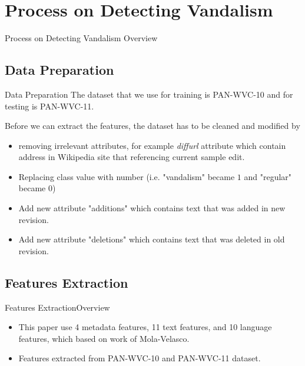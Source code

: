 \documentclass[english]{beamer}
\begin{document}

\section{Process on Detecting Vandalism}

\begin{frame}
	\begin{multicols}{2}
		\tableofcontents[currentsection]
	\end{multicols}
\end{frame}

\begin{frame}
	{Process on Detecting Vandalism}
	{Overview}
	
\end{frame}

\subsection{Data Preparation}

\begin{frame}{Data Preparation}
	The dataset that we use for training is PAN-WVC-10 and for
	testing is PAN-WVC-11.

	Before we can extract the features, the dataset has to be cleaned and
	modified by
	\begin{itemize}
	\item removing irrelevant attributes, for example \textit{diffurl}
	attribute which contain address in Wikipedia site that referencing current
	sample edit.
	\item Replacing class value with number (i.e. "vandalism" became $1$
	and "regular" became $0$)
	\item Add new attribute "additions" which contains text that was added in
	new revision.
	\item Add new attribute "deletions" which contains text that was deleted in
	old revision.
	\end{itemize}
\end{frame}

\subsection{Features Extraction}

\begin{frame}{Features Extraction}{Overview}
	\begin{itemize}
	\item This paper use 4 metadata features, 11 text features, and 10 language
	features, which based on work of Mola-Velasco.
	\item Features extracted from PAN-WVC-10 and PAN-WVC-11 dataset.
	\end{itemize}
\end{frame}
\end{document}
